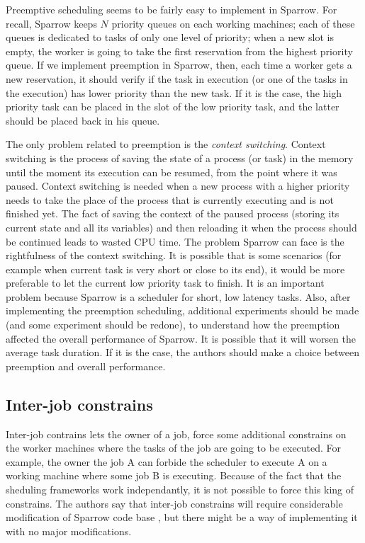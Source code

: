 \documentclass[11pt]{article}
\begin{document}
		Preemptive scheduling seems to be fairly easy to implement in Sparrow. For recall, Sparrow keeps $N$ priority queues on each working machines; each of these queues is dedicated to tasks of only one level of priority; when a new slot is empty, the worker is going to take the first reservation from the highest priority queue. If we implement preemption in Sparrow, then, each time a worker gets a new reservation, it should verify if the task in execution (or one of the tasks in the execution) has lower priority than the new task. If it is the case, the high priority task can be placed in the slot of the low priority task, and the latter should be placed back in his queue.
		
		The only problem related to preemption is the \textit{context switching}. Context switching is the process of saving the state of a process (or task) in the memory until the moment its execution can be resumed, from the point where it was paused. Context switching is needed when a new process with a higher priority needs to take the place of the process that is currently executing and is not finished yet. The fact of saving the context of the paused process (storing its current state and all its variables) and then reloading it when the process should be continued leads to wasted CPU time. The problem Sparrow can face is the rightfulness of the context switching. It is possible that is some scenarios (for example when current task is very short or close to its end), it would be more preferable to let the current low priority task to finish. It is an important problem because Sparrow is a scheduler for short, low latency tasks. Also, after implementing the preemption scheduling, additional experiments should be made (and some experiment should be redone), to understand how the preemption affected the overall performance of Sparrow. It is possible that it will worsen the average task duration. If it is the case, the authors should make a choice between preemption and overall performance.
		
		
	\subsection{Inter-job constrains}
	
		Inter-job contrains lets the owner of a job, force some additional constrains on the worker machines where the tasks of the job are going to be executed. For example, the owner the job A can forbide the scheduler to execute A on a working machine where some job B is executing. Because of the fact that the sheduling frameworks work independantly, it is not possible to force this king of constrains. The authors say that inter-job constrains will require considerable modification of Sparrow code base \cite[section 8]{sparrow}, but there might be a way of implementing it with no major modifications.
		
\end{document}
